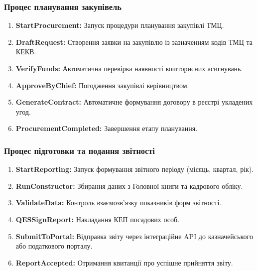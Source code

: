 \documentclass{article}
\begin{document}
\subsubsection{Процес планування закупівель}
\begin{enumerate}
    \item \textbf{StartProcurement:} Запуск процедури планування закупівлі ТМЦ.
    \item \textbf{DraftRequest:} Створення заявки на закупівлю із зазначенням кодів ТМЦ та КЕКВ.
    \item \textbf{VerifyFunds:} Автоматична перевірка наявності кошторисних асигнувань.
    \item \textbf{ApproveByChief:} Погодження закупівлі керівництвом.
    \item \textbf{GenerateContract:} Автоматичне формування договору в реєстрі укладених угод.
    \item \textbf{ProcurementCompleted:} Завершення етапу планування.
\end{enumerate}

\subsubsection{Процес підготовки та подання звітності}
\begin{enumerate}
    \item \textbf{StartReporting:} Запуск формування звітного періоду (місяць, квартал, рік).
    \item \textbf{RunConstructor:} Збирання даних з Головної книги та кадрового обліку.
    \item \textbf{ValidateData:} Контроль взаємозв'язку показників форм звітності.
    \item \textbf{QESSignReport:} Накладання КЕП посадових особ.
    \item \textbf{SubmitToPortal:} Відправка звіту через інтеграційне API до казначейського або податкового порталу.
    \item \textbf{ReportAccepted:} Отримання квитанції про успішне прийняття звіту.
\end{enumerate}
\end{document}
